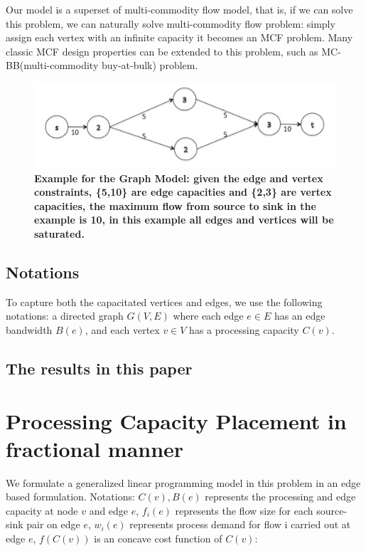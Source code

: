 \documentclass[11pt]{article}
\begin{document}
Our model is a superset of multi-commodity flow model\cite{MCF}, that is, if we can solve this problem, we can naturally solve multi-commodity flow problem: simply assign each vertex with an infinite capacity it becomes an MCF problem. Many classic MCF design properties can be extended to this problem, such as MC-BB(multi-commodity buy-at-bulk) problem\cite{BuyAtBulk,Charikar05,Chekuri2007}. 

\begin{figure}[h]
\includegraphics[width=\linewidth]{picture1.png} 
\caption{ \textbf{Example for the Graph Model: given the edge and vertex constraints, \textnormal{\{5,10\} }are edge capacities and \{2,3\} are vertex capacities, the maximum flow from source to sink in the example is 10, in this example all edges and vertices will be saturated.} }
 \end{figure}
\subsection{Notations}
To capture both the capacitated vertices and edges, we use the following notations:
a directed graph $G(V,E)$ where each edge $e\in E$ has an edge bandwidth $B(e)$, and each vertex $v\in V$ has a processing capacity $C(v)$. 

 


\subsection{The results in this paper}



\section{Processing Capacity Placement in fractional manner}
We formulate a generalized linear programming model in this problem in an edge based formulation. Notations: $C(v),B(e)$ represents the processing and edge capacity at node $v$ and edge $e$, $f_i(e)$ represents the flow size for each source-sink pair on edge $e$, $w_i(e)$ represents process demand for flow i carried out at edge $e$, $f(C(v))$ is an concave cost function of $C(v)$: 
\end{document}
